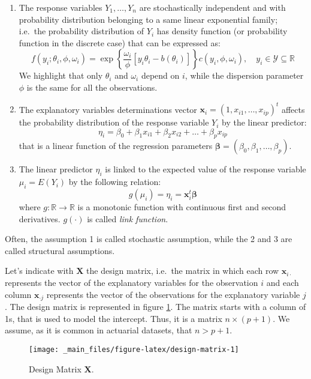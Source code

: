 \documentclass[a4paper, twoside, openright, 12pt]{report}
\providecommand{\tightlist}{%
  \setlength{\itemsep}{0pt}\setlength{\parskip}{0pt}}
\theoremstyle{definition}
\theoremstyle{definition}
\theoremstyle{definition}
\theoremstyle{remark}
\begin{document}
\begin{enumerate}
\def\labelenumi{\arabic{enumi}.}
\tightlist
\item
  The response variables \(Y_1, \dots, Y_n\) are stochastically independent and with probability distribution belonging to a same linear exponential family; i.e.~the probability distribution of \(Y_i\) has density function (or probability function in the discrete case) that can be expressed as:
  \[
  f(y_i; \theta_i, \phi, \omega_i) = \exp{\left\{ \frac{\omega_i}{\phi} \left[y_i\theta_i - b(\theta_i) \right] \right\}} c(y_i, \phi, \omega_i), \quad y_i\in \mathcal{Y}\subseteq\mathbb{R}
  \]
  We highlight that only \(\theta_i\) and \(\omega_i\) depend on \(i\), while the dispersion parameter \(\phi\) is the same for all the observations.
\item
  The explanatory variables determinations vector \(\boldsymbol{x}_i = \left(1, x_{i1}, \dots, x_{ip} \right)^t\) affects the probability distribution of the response variable \(Y_i\) by the linear predictor:
  \[
  \eta_i = \beta_0 + \beta_1 x_{i1} + \beta_2 x_{i2} + \dots + \beta_p x_{ip}
  \]
  that is a linear function of the regression parameters \(\boldsymbol{\beta} = \left( \beta_0, \beta_1, \dots, \beta_p \right)\).
\item
  The linear predictor \(\eta_i\) is linked to the expected value of the response variable \(\mu_i = E(Y_i)\) by the following relation:
  \[
  g(\mu_i) = \eta_i = \boldsymbol{x}_i^t \boldsymbol{\beta}
  \]
  where \(g:\mathbb{R}\rightarrow\mathbb{R}\) is a monotonic function with continuous first and second derivatives. \(g(\cdot)\) is called \emph{link function}.
\end{enumerate}

Often, the assumption 1 is called stochastic assumption, while the 2 and 3 are called structural assumptions.

Let's indicate with \(\boldsymbol{X}\) the design matrix, i.e.~the matrix in which each row \(\boldsymbol{x}_{i\cdot}\) represents the vector of the explanatory variables for the observation \(i\) and each column \(\boldsymbol{x}_{\cdot j}\) represents the vector of the observations for the explanatory variable \(j\). The design matrix is represented in figure \ref{fig:design-matrix}. The matrix starts with a column of 1s, that is used to model the intercept. Thus, it is a matrix \(n\times(p+1)\). We assume, as it is common in actuarial datasets, that \(n>p+1\).

\begin{figure}[!hbtp]

{\centering \texttt{[image: \_main\_files/figure-latex/design-matrix-1]} 

}

\caption{Design Matrix $\boldsymbol{X}$.}\label{fig:design-matrix}
\end{figure}
\end{document}
